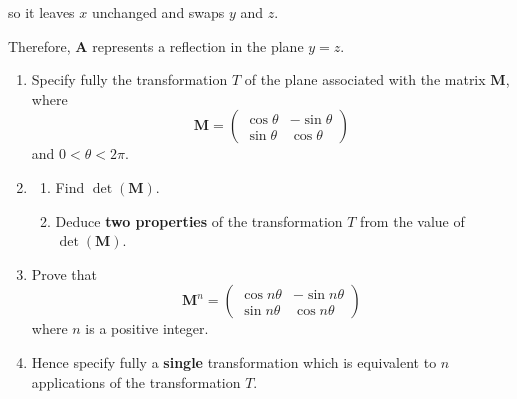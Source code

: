 \documentclass[leqno]{article}
\begin{document}
\begin{enumerate}[
  label=\textbf{\arabic*.},
  leftmargin=*,
  topsep=0pt,
  partopsep=0pt,
  parsep=0pt
]
\begin{djsSolution}
\begin{enumerate}[label=\textbf{(\alph*)}]
so it leaves $x$ unchanged and swaps $y$ and $z$.

Therefore, $\mathbf{A}$ represents a reflection in the plane $y=z$.
\end{enumerate}
\end{djsSolution}


\newpage

\questionitem

\begin{enumerate}[label=\textbf{(\alph*)}]
  \item Specify fully the transformation $T$ of the plane associated with the matrix $\mathbf{M}$, where
  \[
  \mathbf{M} = \begin{pmatrix} \cos\theta & -\sin\theta \\ \sin\theta & \cos\theta \end{pmatrix}
  \]
  and $0<\theta<2\pi$.  \\
  \item
  \begin{enumerate}[label=(\roman*)]
    \item Find $\det(\mathbf{M})$. 
    \item Deduce \textbf{two properties} of the transformation $T$ from the value of $\det(\mathbf{M})$.  \\
  \end{enumerate}
  \item Prove that
  \[
  \mathbf{M}^n = \begin{pmatrix} \cos n\theta & -\sin n\theta \\ \sin n\theta & \cos n\theta \end{pmatrix}
  \]
  where $n$ is a positive integer.  \\
  
  \item Hence specify fully a \textbf{single} transformation which is equivalent to $n$ applications of the transformation $T$.  \\
\end{enumerate}

\vspace*{10pt}


\end{enumerate}
\end{document}

